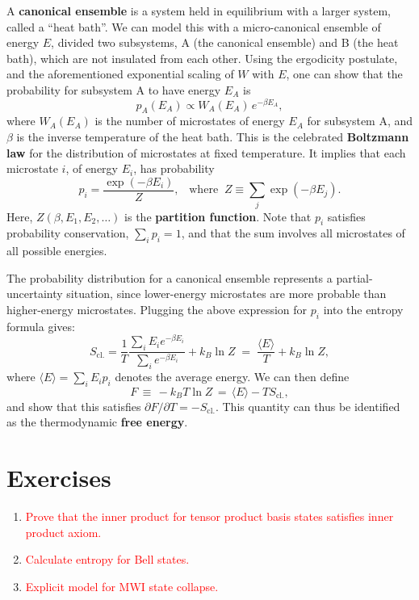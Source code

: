 \documentclass[pra,11pt]{revtex4}
\begin{document}
A \textbf{canonical ensemble} is a system held in equilibrium with a
larger system, called a ``heat bath''.  We can model this with a
micro-canonical ensemble of energy $E$, divided two subsystems, A (the
canonical ensemble) and B (the heat bath), which are not insulated
from each other.  Using the ergodicity postulate, and the
aforementioned exponential scaling of $W$ with $E$, one can show that
the probability for subsystem A to have energy $E_A$ is
$$p_A(E_A) \propto W_A(E_A) \, e^{-\beta E_A},$$
where $W_A(E_A)$ is the number of microstates of energy $E_A$ for
subsystem A, and $\beta$ is the inverse temperature of the heat bath.
This is the celebrated \textbf{Boltzmann law} for the distribution of
microstates at fixed temperature.  It implies that each microstate
$i$, of energy $E_i$, has probability
$$p_i = \frac{\exp(-\beta E_i)}{Z}, \;\;\;\mathrm{where}\;\;Z \equiv \sum_j \exp(-\beta E_j).$$
Here, $Z(\beta,E_1, E_2,\dots)$ is the \textbf{partition function}.
Note that $p_i$ satisfies probability conservation, $\sum_i p_i = 1$,
and that the sum involves all microstates of all possible energies.

The probability distribution for a canonical ensemble represents a
partial-uncertainty situation, since lower-energy microstates are
more probable than higher-energy microstates.  Plugging the above
expression for $p_i$ into the entropy formula gives:
$$S_{\mathrm{cl.}} = \frac{1}{T} \frac{\sum_i E_i e^{-\beta E_i}}{\sum_i e^{-\beta E_i}} + k_B \ln Z \;=\; \frac{\langle E\rangle}{T} + k_B \ln Z,$$
where $\langle E\rangle = \sum_i E_i p_i$ denotes the average energy.
We can then define
$$F \,\equiv\, - k_B T \ln Z \,=\, \langle E \rangle - TS_{\mathrm{cl.}},$$
and show that this satisfies $\partial F/\partial T = -
S_{\mathrm{cl.}}$.  This quantity can thus be identified as the
thermodynamic \textbf{free energy}.



\section*{Exercises}

\begin{enumerate}
\item \textcolor{red}{Prove that the inner product for tensor product basis states satisfies inner product axiom.}
\item \textcolor{red}{Calculate entropy for Bell states.}
\item \textcolor{red}{Explicit model for MWI state collapse.}
\end{enumerate}
\end{document}
